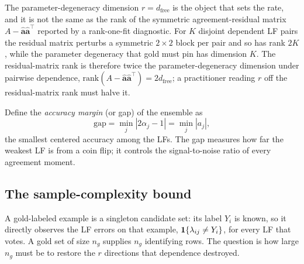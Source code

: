 \begin{remark}
\label{rmk:r-definition}
The parameter-degeneracy dimension $r = d_{\mathrm{free}}$ is the
object that sets the rate, and it is not the same as the rank of the
symmetric agreement-residual matrix $A - \hat{\bm{a}}\hat{\bm{a}}^\top$
reported by a rank-one-fit diagnostic. For $K$ disjoint dependent LF
pairs the residual matrix perturbs a symmetric $2 \times 2$ block per
pair and so has rank $2K$, while the parameter degeneracy that gold
must pin has dimension $K$. The residual-matrix rank is therefore
twice the parameter-degeneracy dimension under pairwise dependence,
$\mathrm{rank}(A - \hat{\bm{a}}\hat{\bm{a}}^\top) = 2 d_{\mathrm{free}}$;
a practitioner reading $r$ off the residual-matrix rank must halve it.
\end{remark}

Define the \emph{accuracy margin} (or gap) of the ensemble as
\begin{equation}
  \mathrm{gap} = \min_j |2\alpha_j - 1| = \min_j |a_j|,
  \label{eq:meth-gap}
\end{equation}
the smallest centered accuracy among the LFs. The gap measures how
far the weakest LF is from a coin flip; it controls the
signal-to-noise ratio of every agreement moment.

\subsection{The sample-complexity bound}

A gold-labeled example is a singleton candidate set: its label $Y_i$
is known, so it directly observes the LF errors on that example,
$\mathbf{1}\{\lambda_{ij} \neq Y_i\}$, for every LF that votes. A gold set of
size $n_g$ supplies $n_g$ identifying rows. The question is how large
$n_g$ must be to restore the $r$ directions that dependence destroyed.

